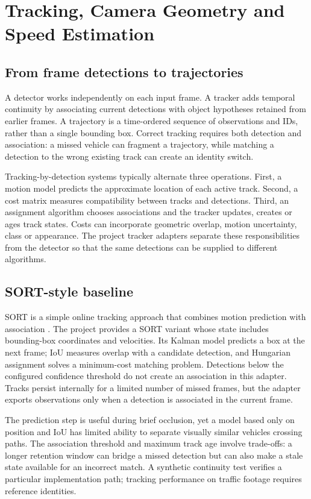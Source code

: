 \section{Tracking, Camera Geometry and Speed Estimation}
\label{sec:tracking-geometry}
\subsection{From frame detections to trajectories}
A detector works independently on each input frame. A tracker adds temporal continuity by associating current detections with object hypotheses retained from earlier frames. A trajectory is a time-ordered sequence of observations and IDs, rather than a single bounding box. Correct tracking requires both detection and association: a missed vehicle can fragment a trajectory, while matching a detection to the wrong existing track can create an identity switch.

Tracking-by-detection systems typically alternate three operations. First, a motion model predicts the approximate location of each active track. Second, a cost matrix measures compatibility between tracks and detections. Third, an assignment algorithm chooses associations and the tracker updates, creates or ages track states. Costs can incorporate geometric overlap, motion uncertainty, class or appearance. The project tracker adapters separate these responsibilities from the detector so that the same detections can be supplied to different algorithms.

\subsection{SORT-style baseline}
SORT is a simple online tracking approach that combines motion prediction with association \cite{sort}. The project provides a SORT variant whose state includes bounding-box coordinates and velocities. Its Kalman model predicts a box at the next frame; IoU measures overlap with a candidate detection, and Hungarian assignment solves a minimum-cost matching problem. Detections below the configured confidence threshold do not create an association in this adapter. Tracks persist internally for a limited number of missed frames, but the adapter exports observations only when a detection is associated in the current frame.

The prediction step is useful during brief occlusion, yet a model based only on position and IoU has limited ability to separate visually similar vehicles crossing paths. The association threshold and maximum track age involve trade-offs: a longer retention window can bridge a missed detection but can also make a stale state available for an incorrect match. A synthetic continuity test verifies a particular implementation path; tracking performance on traffic footage requires reference identities.

